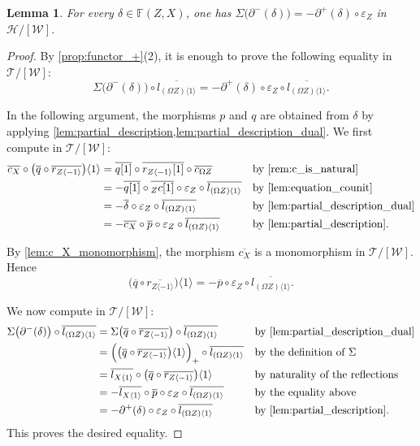 \documentclass[a4paper,reqno,10pt]{amsart}
\newtheorem{lemma}[lemma]{Lemma}
\theoremstyle{definition}
\theoremstyle{definition}
\theoremstyle{definition}
\theoremstyle{definition}
\theoremstyle{plain}
\newcommand{\ovl}[1]{\overline{#1}}
\newcommand{\BF}{\mathbb{F}}
\newcommand{\CH}{\mathcal{H}}
\newcommand{\CT}{\mathcal{T}}
\newcommand{\CW}{\mathcal{W}}
\begin{document}
\begin{lemma}
\label{lem:the_equation}
For every $\delta\in\BF(Z,X)$, one has
$
\Sigma\bigl(\partial^-(\delta)\bigr)
=
-\partial^+(\delta)\circ\varepsilon_Z
$
in $\CH/[\CW]$.
\end{lemma}
\begin{proof}
By \cref{prop:functor_+}(2), it is enough to prove the following equality
in $\CT/[\CW]$:
\[
\Sigma\bigl(\partial^-(\delta)\bigr)
\circ\ovl{l_{(\Omega Z)\langle1\rangle}}
=
-\partial^+(\delta)\circ\varepsilon_Z
\circ\ovl{l_{(\Omega Z)\langle1\rangle}}.
\]

In the following argument, the morphisms $p$ and $q$ are obtained from
$\delta$ by applying
\cref{lem:partial_description,lem:partial_description_dual}.
We first compute in $\CT/[\CW]$:
\begin{align*}
\ovl{c_X}
\circ
\bigl(
  \ovl q\circ\ovl{r_{Z\langle-1\rangle}}
\bigr)\langle1\rangle
&=
\ovl{q[1]}
\circ\ovl{r_{Z\langle-1\rangle}[1]}
\circ\ovl{c_{\Omega Z}}
&&
\text{by \cref{rem:c_is_natural}}
\\
&=
-\ovl{q[1]}
\circ\ovl{{}_Zc[1]}
\circ\varepsilon_Z
\circ\ovl{l_{(\Omega Z)\langle1\rangle}}
&&
\text{by \cref{lem:equation_counit}}
\\
&=
-\ovl\delta
\circ\varepsilon_Z
\circ\ovl{l_{(\Omega Z)\langle1\rangle}}
&&
\text{by \cref{lem:partial_description_dual}}
\\
&=
-\ovl{c_X}
\circ\ovl p
\circ\varepsilon_Z
\circ\ovl{l_{(\Omega Z)\langle1\rangle}}
&&
\text{by \cref{lem:partial_description}}.
\end{align*}

By \cref{lem:c_X_monomorphism}, the morphism $\ovl{c_X}$ is a
monomorphism in $\CT/[\CW]$. Hence
\[
\bigl(
  \ovl q\circ\ovl{r_{Z\langle-1\rangle}}
\bigr)\langle1\rangle
=
-\ovl p\circ\varepsilon_Z
\circ\ovl{l_{(\Omega Z)\langle1\rangle}}.
\]

We now compute in $\CT/[\CW]$:
\begin{align*}
\Sigma\bigl(\partial^-(\delta)\bigr)
\circ\ovl{l_{(\Omega Z)\langle1\rangle}}
&=
\Sigma\bigl(
  \ovl q\circ\ovl{r_{Z\langle-1\rangle}}
\bigr)
\circ\ovl{l_{(\Omega Z)\langle1\rangle}}
&&
\text{by \cref{lem:partial_description_dual}}
\\
&=
\Bigl(
  \bigl(
    \ovl q\circ\ovl{r_{Z\langle-1\rangle}}
  \bigr)\langle1\rangle
\Bigr)_+
\circ\ovl{l_{(\Omega Z)\langle1\rangle}}
&&
\text{by the definition of $\Sigma$}
\\
&=
\ovl{l_{X\langle1\rangle}}
\circ
\bigl(
  \ovl q\circ\ovl{r_{Z\langle-1\rangle}}
\bigr)\langle1\rangle
&&
\text{by naturality of the reflections}
\\
&=
-\ovl{l_{X\langle1\rangle}}
\circ\ovl p
\circ\varepsilon_Z
\circ\ovl{l_{(\Omega Z)\langle1\rangle}}
&&
\text{by the equality above}
\\
&=
-\partial^+(\delta)
\circ\varepsilon_Z
\circ\ovl{l_{(\Omega Z)\langle1\rangle}}
&&
\text{by \cref{lem:partial_description}}.
\end{align*}
This proves the desired equality.
\end{proof}
\end{document}

